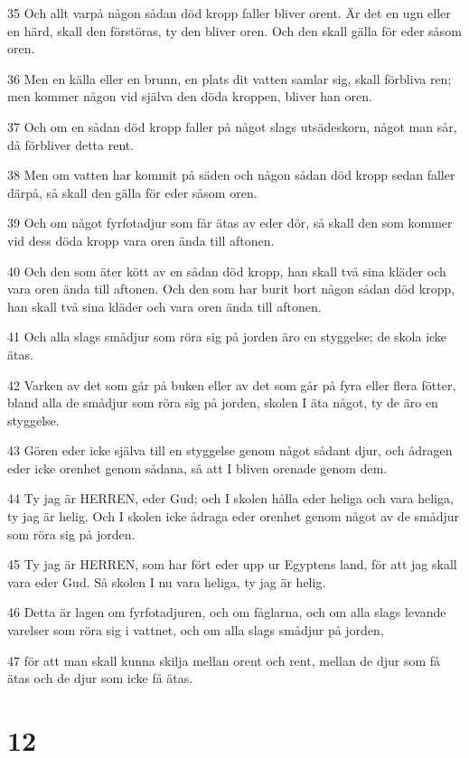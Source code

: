 \par 35 Och allt varpå någon sådan död kropp faller bliver orent. Är det en ugn eller en härd, skall den förstöras, ty den bliver oren. Och den skall gälla för eder såsom oren.
\par 36 Men en källa eller en brunn, en plats dit vatten samlar sig, skall förbliva ren; men kommer någon vid själva den döda kroppen, bliver han oren.
\par 37 Och om en sådan död kropp faller på något slags utsädeskorn, något man sår, då förbliver detta rent.
\par 38 Men om vatten har kommit på säden och någon sådan död kropp sedan faller därpå, så skall den gälla för eder såsom oren.
\par 39 Och om något fyrfotadjur som får ätas av eder dör, så skall den som kommer vid dess döda kropp vara oren ända till aftonen.
\par 40 Och den som äter kött av en sådan död kropp, han skall två sina kläder och vara oren ända till aftonen. Och den som har burit bort någon sådan död kropp, han skall två sina kläder och vara oren ända till aftonen.
\par 41 Och alla slags smådjur som röra sig på jorden äro en styggelse; de skola icke ätas.
\par 42 Varken av det som går på buken eller av det som går på fyra eller flera fötter, bland alla de smådjur som röra sig på jorden, skolen I äta något, ty de äro en styggelse.
\par 43 Gören eder icke själva till en styggelse genom något sådant djur, och ådragen eder icke orenhet genom sådana, så att I bliven orenade genom dem.
\par 44 Ty jag är HERREN, eder Gud; och I skolen hålla eder heliga och vara heliga, ty jag är helig. Och I skolen icke ådraga eder orenhet genom något av de smådjur som röra sig på jorden.
\par 45 Ty jag är HERREN, som har fört eder upp ur Egyptens land, för att jag skall vara eder Gud. Så skolen I nu vara heliga, ty jag är helig.
\par 46 Detta är lagen om fyrfotadjuren, och om fåglarna, och om alla slags levande varelser som röra sig i vattnet, och om alla slags smådjur på jorden,
\par 47 för att man skall kunna skilja mellan orent och rent, mellan de djur som få ätas och de djur som icke få ätas.

\chapter{12}

